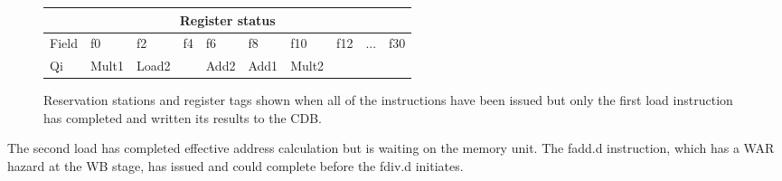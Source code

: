 \begin{figure}[h]
        \vspace{0.5cm}
        
        \begin{tabular}{|l|l|l|l|l|l|l|l|l|l|}
            \hline
            \multicolumn{10}{|c|}{Register status} \\
            \hline
            Field & f0 & f2 & f4 & f6 & f8 & f10 & f12 & ... & f30 \\
            \hline
            Qi & Mult1 & Load2 & & Add2 & Add1 & Mult2 & & & \\
            \hline
        \end{tabular}
        \caption{Reservation stations and register tags shown when all of the instructions have been issued but only the first load instruction has completed and written its results to the CDB.}
    \end{figure}

    The second load has completed effective address calculation but is waiting on the memory unit. The fadd.d instruction, which has a WAR hazard at the WB stage, has issued and could complete before the fdiv.d initiates.